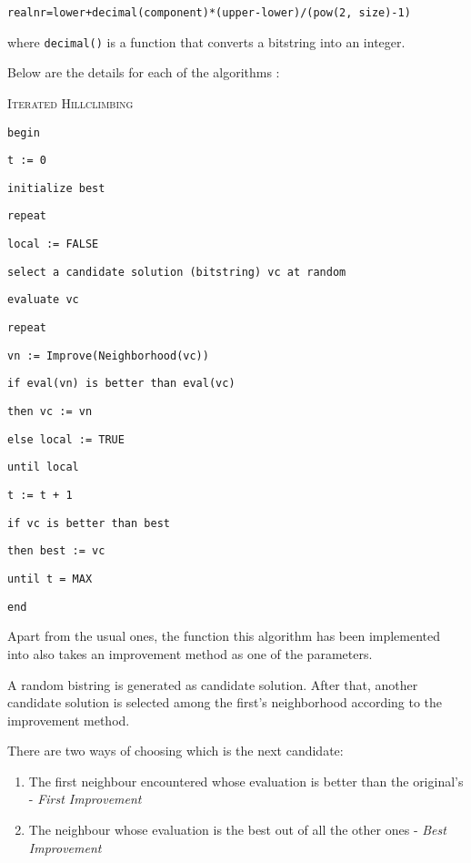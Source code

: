 \documentclass{article}
\begin{document}
\vspace{3mm}
\texttt{realnr=lower+decimal(component)*(upper-lower)/(pow(2, size)-1)}
\vspace{3mm}

where \texttt{decimal()} is a function that converts a bitstring into an integer.

\vspace{5mm}
Below are the details for each of the algorithms \cite{pmihaela}:

\newpage

\textsc{Iterated Hillclimbing}

\texttt{begin}

\texttt{t := 0}

\texttt{initialize best}

\texttt{repeat}

\quad \quad \texttt{local := FALSE}

\quad \quad \texttt{select a candidate solution (bitstring) vc at random}

\quad \quad\texttt{evaluate vc}

\quad \quad\texttt{repeat}

\quad \quad \quad \quad \texttt{vn := Improve(Neighborhood(vc))}

\quad \quad \quad \quad \texttt{if eval(vn) is better than eval(vc)}

\quad \quad \quad \quad \quad \quad \texttt{then vc := vn}

\quad \quad \quad \quad \texttt{else local := TRUE}

\quad \quad \texttt{until local}

\quad \quad \texttt{t := t + 1}

\quad \quad \texttt{if vc is better than best}

\quad \quad \quad \quad \texttt{then best := vc}

\texttt{until t = MAX}

\texttt{end}

\vspace{5mm}

Apart from the usual ones, the function this algorithm has been implemented into also takes an improvement method as one of the parameters.

A random bistring is generated as candidate solution. After that, another candidate solution is selected among the first's neighborhood according to the improvement method.

There are two ways of choosing which is the next candidate:
\begin{enumerate}
\item The first neighbour encountered whose evaluation is better than the original's - \textit{First Improvement}
\item The neighbour whose evaluation is the best out of all the other ones - \textit{Best Improvement}
\end{enumerate}
\end{document}
